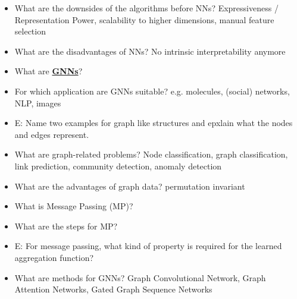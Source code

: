\documentclass{report}
\begin{document}
\begin{itemize}
		\item What are the downsides of the algorithms before NNs?
		\newline Expressiveness / Representation Power, scalability to higher dimensions, manual feature selection
		\item What are the disadvantages of NNs?
		\newline No intrinsic interpretability anymore
		
		\item What are \textbf{\underline{GNNs}}?
		\newline 
		\item For which application are GNNs suitable?
		\newline e.g. molecules, (social) networks, NLP, images
		\item E: Name two examples for graph like structures and epxlain what the nodes and edges represent.
		\newline 
		\item What are graph-related problems?
		\newline Node classification, graph classification, link prediction, community detection, anomaly detection
		\item What are the advantages of graph data?
		\newline permutation invariant
		\item What is Message Passing (MP)?
		\newline 
		\item What are the steps for MP?
		\newline 
		\item E: For message passing, what kind of property is required for the learned aggregation function?
		\newline 
		\item What are methods for GNNs?
		\newline Graph Convolutional Network, Graph Attention Networks, Gated Graph Sequence Networks
		

\end{itemize}
\end{document}
